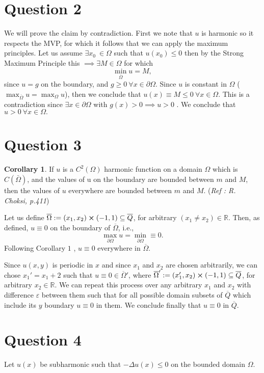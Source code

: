 \documentclass[12pt]{article}
\theoremstyle{definition}
\newtheorem{corollary}{Corollary}[theorem]
\theoremstyle{definition}
\theoremstyle{definition}
\theoremstyle{definition}
\theoremstyle{definition}
\theoremstyle{example}
\theoremstyle{note}
\theoremstyle{remark}
\theoremstyle{example}
\begin{document}
 			\section*{Question 2}
 				We will prove the claim by contradiction. First we note that $u$ is harmonic so it respects the MVP, for which it follows that we can apply the maximum principles. Let us assume $\exists x_{0} \ \in \Omega $ such that $u(x_{0}) \le 0 $ then by the Strong Maximum Principle this $\implies \exists M \in \Omega$ for which 
 				$$ \min\limits_{\overline{\Omega}} u = M,$$
 				since $u = g$ on the boundary, and $g \ge 0 \ \forall x \in \partial\Omega$. Since $u$ is constant in $\Omega$ ($\max_{\overline{\Omega}} u = \max_{\Omega} u$), then we conclude that $u(x) \equiv M \le 0 \ \forall x \in \Omega$. This is a contradiction since $\exists x \in \partial \Omega$ with $g(x) > 0 \implies u>0$ . We conclude that $u > 0 \ \forall x \in \Omega.$
 			\section*{Question 3}
 				\begin{corollary}
 					If $u$ is a $C^{2}(\Omega)$ harmonic function on a domain $\Omega$ which is $C(\bar{\Omega})$, and the values of u on the boundary are bounded between $m$ and $M$, then the values of $u$ everywhere are bounded between $m$ and $M$. (\textit{Ref : R. Choksi, p.411})
 				\end{corollary}
 				\noindent Let us define $\overline{\Omega} := (x_{1} , x_{2} ) \cross (-1,1)  \subseteq \overline{Q}$, for arbitrary $(x_{1} \neq x_{2}) \in \mathbb{R}$. Then, as defined, $u \equiv 0$ on the boundary of $\overline{\Omega}$, i.e., 
 				$$ \max\limits_{\partial\Omega} u = \min\limits_{\partial\Omega} \equiv 0.$$
 				Following Corollary $1$ , $u \equiv 0$ everywhere in $\overline{\Omega}$. 
 				
 				\noindent Since $u(x,y)$ is periodic in $x$ and since $x_{1}$ and $x_{2}$ are chosen arbitrarily, we can chose  $x_{1} ' = x_{1} +2$ such that $u \equiv 0 \in \overline{\Omega} '$, where $\overline{\Omega}' := (x_{1}' , x_{2} ) \cross (-1,1)  \subseteq \overline{Q}$, for arbitrary $x_{2} \in \mathbb{R}$. We can repeat this process over any arbitrary $x_{1}$ and $x_{2}$ with difference $\varepsilon$ between them such that for all possible domain subsets of $\overline{Q}$ which include its $y$ boundary $u\equiv 0$ in them.  We conclude finally that $u \equiv 0 $ in  $\overline{Q}$.
 			\section*{Question 4}
 			 Let $u(x)$ be subharmonic such that $- \Delta u(x) \le 0$ on the bounded domain $\Omega$.  
 			 
\end{document}
